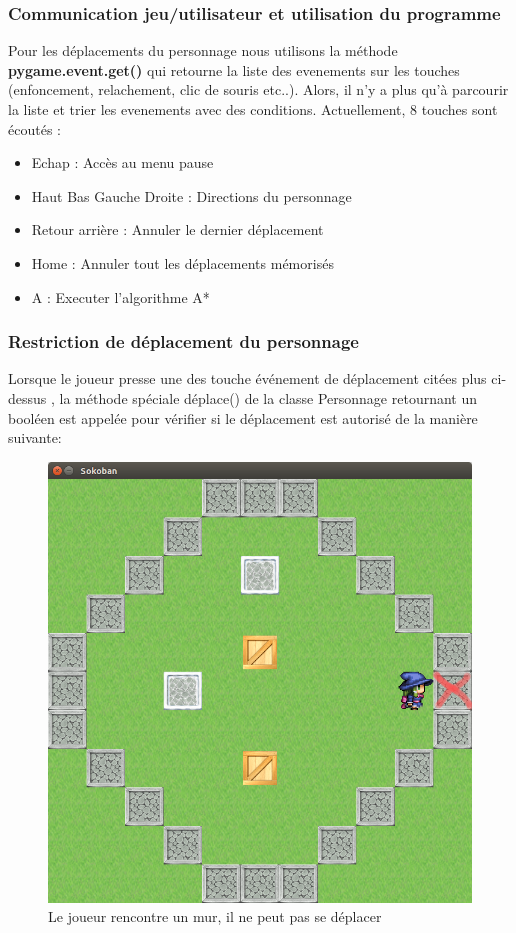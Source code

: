 \documentclass{article}
\begin{document}
		\subsubsection{Communication jeu/utilisateur et utilisation du programme}
		
			Pour les déplacements du personnage nous utilisons la méthode  \textbf{pygame.event.get()} qui retourne la liste des evenements sur les touches (enfoncement, relachement, clic de souris etc..). Alors, il n'y a
			plus qu'à parcourir la liste et trier les evenements avec des conditions. \newline
			Actuellement, 8 touches sont écoutés :
			\begin{itemize}
			 \item Echap : Accès au menu pause
			 \item Haut Bas Gauche Droite : Directions du personnage
			 \item Retour arrière : Annuler le dernier déplacement
			 \item Home : Annuler tout les déplacements mémorisés
			 \item A : Executer l'algorithme A*
			\end{itemize}

		\subsubsection{Restriction de déplacement du personnage}		
		Lorsque le joueur presse une des touche événement de déplacement citées plus ci-dessus , la méthode spéciale déplace() de la classe Personnage retournant un booléen est appelée pour vérifier si le déplacement 
		est autorisé de la manière suivante:
\begin{figure}[!h]
\centering
\includegraphics[scale=0.25]{img/01.png}
\caption{Le joueur rencontre un mur, il ne peut pas se déplacer}			
\end{figure}
\end{document}
